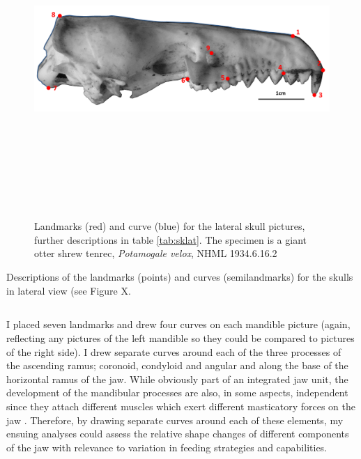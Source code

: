 \begin{figure}[!htb] 
  \centering
  \includegraphics[width=12cm, height=12cm, keepaspectratio=true]
  {Methods/figures/sklat_landmarks_pot_vel.png}
    \caption[Skulls: lateral landmarks] {Landmarks (red) and curve (blue) for the lateral skull pictures, further descriptions in table \ref{tab:sklat}. The specimen is a giant otter shrew tenrec, \textit{Potamogale velox}, NHML 1934.6.16.2}
  \label{fig:sklat_landmarks}
  \end{figure}

\begin{table}[!htb]
\caption[Skulls: lateral landmarks]
		{Descriptions of the landmarks (points) and curves (semilandmarks) for the skulls in lateral view (see Figure X.} 

\label{tab:sklat}
\end{table}

\newpage
\subsection{}
	I placed seven landmarks and drew four curves on each mandible picture (again, reflecting any pictures of the left mandible so they could be compared to pictures of the right side). I drew separate curves around each of the three processes of the ascending ramus; coronoid, condyloid and angular and along the base of the horizontal ramus of the jaw. While obviously part of an integrated jaw unit, the development of the mandibular processes are also, in some aspects, independent since they attach different muscles which exert different masticatory forces on the jaw \citep{Barrow2008}. Therefore, by drawing separate curves around each of these elements, my ensuing analyses could assess the relative shape changes of different components of the jaw with relevance to variation in feeding strategies and capabilities.
	

